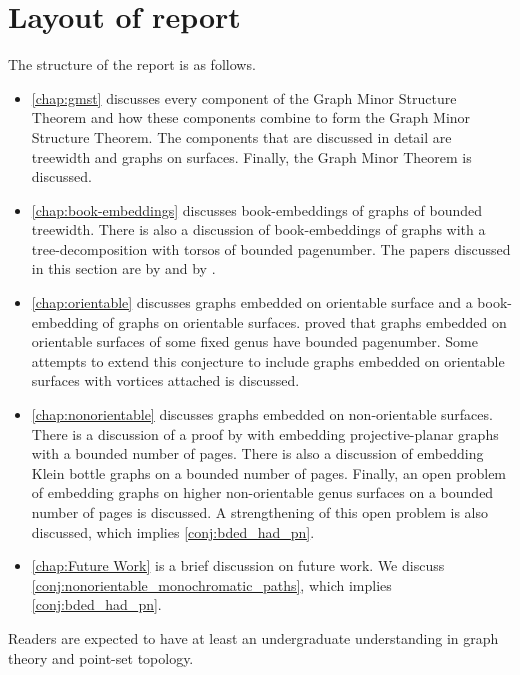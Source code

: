 \section{Layout of report}
The structure of the report is as follows.
\begin{itemize}
	\item \cref{chap:gmst} discusses every component of the Graph Minor Structure Theorem and how these components combine to form the Graph Minor Structure Theorem. The components that are discussed in detail are treewidth and graphs on surfaces. Finally, the Graph Minor Theorem is discussed.
	\item \cref{chap:book-embeddings} discusses book-embeddings of graphs of bounded treewidth. There is also a discussion of book-embeddings of graphs with a tree-decomposition with torsos of bounded pagenumber. The papers discussed in this section are by \textcite{hickingbothamStackNumberCliqueSum2023} and by \textcite{ganleyPagenumberTrees2001}. 
	\item \cref{chap:orientable} discusses graphs embedded on orientable surface and a book-embedding of graphs on orientable surfaces. \textcite{heathPagenumberGenusGraphs1992} proved that graphs embedded on orientable surfaces of some fixed genus have bounded pagenumber. Some attempts to  extend this conjecture to include graphs embedded on orientable surfaces with vortices attached is discussed.
	\item \cref{chap:nonorientable} discusses graphs embedded on non-orientable surfaces. There is a discussion of a proof by \textcite{nakamotoBookEmbeddingProjectiveplanar2015} with embedding projective-planar graphs with a bounded number of pages. There is also a discussion of embedding Klein bottle graphs on a bounded number of pages. Finally, an open problem of embedding graphs on higher non-orientable genus surfaces on a bounded number of pages is discussed. A strengthening of this open problem is also discussed, which implies \cref{conj:bded_had_pn}.
	\item \cref{chap:Future Work} is a brief discussion on future work. We discuss \cref{conj:nonorientable_monochromatic_paths}, which implies \cref{conj:bded_had_pn}. 
\end{itemize}

Readers are expected to have at least an undergraduate understanding in graph theory and point-set topology. 
